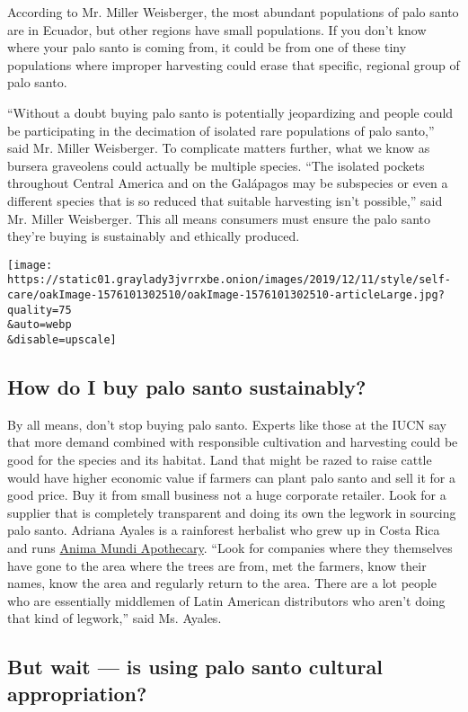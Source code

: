 According to Mr. Miller Weisberger, the most abundant populations of
palo santo are in Ecuador, but other regions have small populations. If
you don't know where your palo santo is coming from, it could be from
one of these tiny populations where improper harvesting could erase that
specific, regional group of palo santo.

``Without a doubt buying palo santo is potentially jeopardizing and
people could be participating in the decimation of isolated rare
populations of palo santo,'' said Mr. Miller Weisberger. To complicate
matters further, what we know as bursera graveolens could actually be
multiple species. ``The isolated pockets throughout Central America and
on the Galápagos may be subspecies or even a different species that is
so reduced that suitable harvesting isn't possible,'' said Mr. Miller
Weisberger. This all means consumers must ensure the palo santo they're
buying is sustainably and ethically produced.

\texttt{[image: https://static01.graylady3jvrrxbe.onion/images/2019/12/11/style/self-care/oakImage-1576101302510/oakImage-1576101302510-articleLarge.jpg?quality=75\\\&auto=webp\\\&disable=upscale]}

\hypertarget{how-do-i-buy-palo-santo-sustainably}{%
\subsection{How do I buy palo santo
sustainably?}\label{how-do-i-buy-palo-santo-sustainably}}

By all means, don't stop buying palo santo. Experts like those at the
IUCN say that more demand combined with responsible cultivation and
harvesting could be good for the species and its habitat. Land that
might be razed to raise cattle would have higher economic value if
farmers can plant palo santo and sell it for a good price. Buy it from
small business not a huge corporate retailer. Look for a supplier that
is completely transparent and doing its own the legwork in sourcing palo
santo. Adriana Ayales is a rainforest herbalist who grew up in Costa
Rica and runs \href{https://animamundiherbals.com/}{Anima Mundi
Apothecary}. ``Look for companies where they themselves have gone to the
area where the trees are from, met the farmers, know their names, know
the area and regularly return to the area. There are a lot people who
are essentially middlemen of Latin American distributors who aren't
doing that kind of legwork,'' said Ms. Ayales.

\hypertarget{but-wait--is-using-palo-santo-cultural-appropriation}{%
\subsection{But wait --- is using palo santo cultural
appropriation?}\label{but-wait--is-using-palo-santo-cultural-appropriation}}

